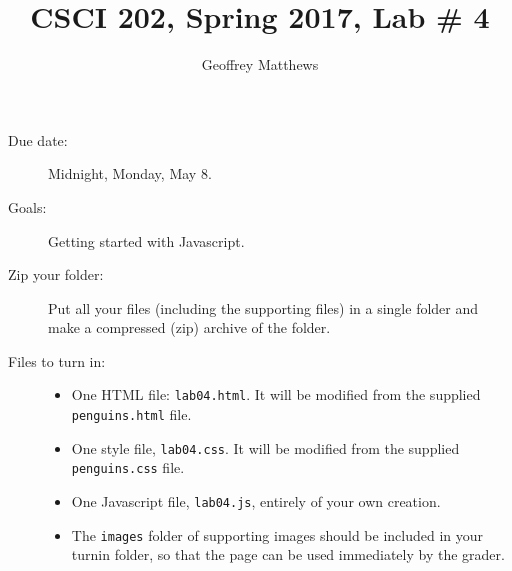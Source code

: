 \documentclass{article}
\title{CSCI 202, Spring 2017, Lab \# 4}
\author{Geoffrey Matthews}
\begin{document}
\maketitle

\begin{description}

\item[Due date:] Midnight, Monday, May 8.

\item[Goals:] Getting started with Javascript.

\item[Zip your folder:]
  Put all your files (including the supporting files) in a single
  folder and  make a compressed (zip) archive of the folder.

\item[Files to turn in:]\mbox{}
  \begin{itemize}
  \item
    One  {HTML} file: {\tt lab04.html}.
    It will be modified from the supplied {\tt penguins.html} file.
  \item
    One  style file, {\tt lab04.css}.  It
    will be modified from the supplied {\tt penguins.css} file.
\item One  Javascript file, {\tt lab04.js}, entirely of your own
  creation. 
\item The {\tt images} folder of supporting images should be included
  in your turnin folder, so that the page can be used immediately by
  the grader.
  \end{itemize}


\end{description}
\end{document}

